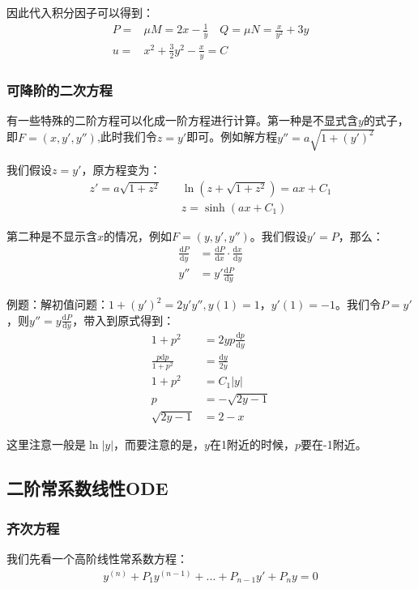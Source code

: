 \documentclass{ctexart}
\begin{document}
因此代入积分因子可以得到：
\begin{align*}
 P=&\mu M=2x-\frac{1}{y}\quad Q=\mu N=\frac{x}{y^2}+3y\\
u=&x^2+\frac{3}{2}y^2-\frac{x}{y}=C    
\end{align*}

\subsubsection{可降阶的二次方程}
有一些特殊的二阶方程可以化成一阶方程进行计算。第一种是不显式含$y$的式子，即$F=(x,y',y'')$,此时我们令$z=y'$即可。例如解方程$y''=a\sqrt{1+(y')^2}$

我们假设$z=y'$，原方程变为：
\begin{align*}
 z'=a\sqrt{1+z^2}\quad& \ln(z+\sqrt{1+z^2})=ax+C_1\\
&z=\sinh (ax+C_1)    
\end{align*}

第二种是不显示含$x$的情况，例如$F=(y,y',y'')$。我们假设$y'=P$，那么：
\begin{align*}
 \frac{\mathrm{d}P}{\mathrm{d}y }&=\frac{\mathrm{d}P}{\mathrm{d}x }\cdot  \frac{\mathrm{d}x}{\mathrm{d}y }\\
   y''&={y'}\frac{\mathrm{d}P}{\mathrm{d}y }
\end{align*}

例题：解初值问题：$1+(y')^2=2y'y'',y(1)=1，y'(1)=-1$。我们令$P=y'$，则$y''=y\frac{\mathrm{d}P}{\mathrm{d}y}$，带入到原式得到：
\begin{align*}
1+p^2&=2yp\frac{\mathrm{d}p}{\mathrm{d}y}\\
\frac{p\mathrm{d}p }{1+p^2}&=\frac{\mathrm{d}y }{2y}\\
1+p^2&=C_1|y|\\
  p&=-\sqrt{2y-1}\\
\sqrt{2y-1}&=2-x  
\end{align*}

这里注意一般是$\ln |y|$，而要注意的是，$y$在1附近的时候，$p$要在-1附近。

\subsection{二阶常系数线性ODE}
\subsubsection{齐次方程}
我们先看一个高阶线性常系数方程：
\begin{align*}
y^{(n)}+P_1y^{(n-1)}+...+P_{n-1}y'+P_ny=0\tag{4-9}   
\end{align*}
\end{document}
